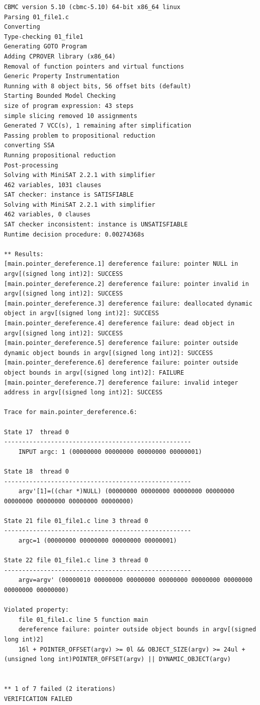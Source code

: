 \begin{verbatim}
CBMC version 5.10 (cbmc-5.10) 64-bit x86_64 linux
Parsing 01_file1.c
Converting
Type-checking 01_file1
Generating GOTO Program
Adding CPROVER library (x86_64)
Removal of function pointers and virtual functions
Generic Property Instrumentation
Running with 8 object bits, 56 offset bits (default)
Starting Bounded Model Checking
size of program expression: 43 steps
simple slicing removed 10 assignments
Generated 7 VCC(s), 1 remaining after simplification
Passing problem to propositional reduction
converting SSA
Running propositional reduction
Post-processing
Solving with MiniSAT 2.2.1 with simplifier
462 variables, 1031 clauses
SAT checker: instance is SATISFIABLE
Solving with MiniSAT 2.2.1 with simplifier
462 variables, 0 clauses
SAT checker inconsistent: instance is UNSATISFIABLE
Runtime decision procedure: 0.00274368s

** Results:
[main.pointer_dereference.1] dereference failure: pointer NULL in argv[(signed long int)2]: SUCCESS
[main.pointer_dereference.2] dereference failure: pointer invalid in argv[(signed long int)2]: SUCCESS
[main.pointer_dereference.3] dereference failure: deallocated dynamic object in argv[(signed long int)2]: SUCCESS
[main.pointer_dereference.4] dereference failure: dead object in argv[(signed long int)2]: SUCCESS
[main.pointer_dereference.5] dereference failure: pointer outside dynamic object bounds in argv[(signed long int)2]: SUCCESS
[main.pointer_dereference.6] dereference failure: pointer outside object bounds in argv[(signed long int)2]: FAILURE
[main.pointer_dereference.7] dereference failure: invalid integer address in argv[(signed long int)2]: SUCCESS

Trace for main.pointer_dereference.6:

State 17  thread 0
----------------------------------------------------
    INPUT argc: 1 (00000000 00000000 00000000 00000001)

State 18  thread 0
----------------------------------------------------
    argv'[1]=((char *)NULL) (00000000 00000000 00000000 00000000 00000000 00000000 00000000 00000000)

State 21 file 01_file1.c line 3 thread 0
----------------------------------------------------
    argc=1 (00000000 00000000 00000000 00000001)

State 22 file 01_file1.c line 3 thread 0
----------------------------------------------------
    argv=argv' (00000010 00000000 00000000 00000000 00000000 00000000 00000000 00000000)

Violated property:
    file 01_file1.c line 5 function main
    dereference failure: pointer outside object bounds in argv[(signed long int)2]
    16l + POINTER_OFFSET(argv) >= 0l && OBJECT_SIZE(argv) >= 24ul + (unsigned long int)POINTER_OFFSET(argv) || DYNAMIC_OBJECT(argv)


** 1 of 7 failed (2 iterations)
VERIFICATION FAILED
\end{verbatim}

